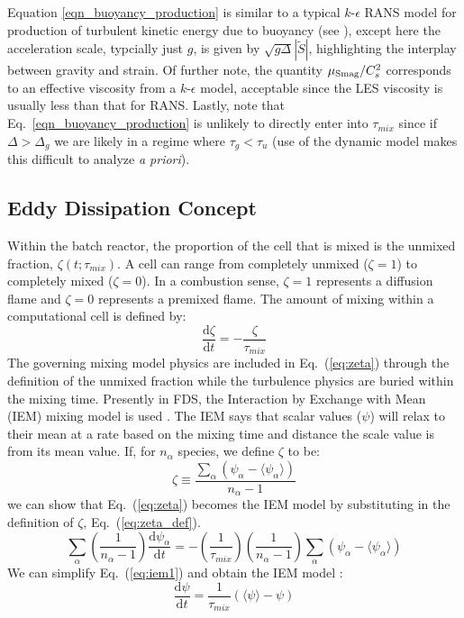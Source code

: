 Equation \ref{eqn_buoyancy_production} is similar to a typical $k$-$\epsilon$ RANS model for production of turbulent kinetic energy due to buoyancy (see \cite{Teiszen:2004b,Merci:2005}), except here the acceleration scale, typcially just $g$, is given by $\sqrt{\!g\Delta}|\tilde{S}|$, highlighting the interplay between gravity and strain.  Of further note, the quantity $\mu_{\mbox{\scriptsize Smag}}/C_s^2$ corresponds to an effective viscosity from a $k$-$\epsilon$ model, acceptable since the LES viscosity is usually less than that for RANS.  Lastly, note that Eq.~\ref{eqn_buoyancy_production} is unlikely to directly enter into $\tau_{mix}$ since if $\Delta > \Delta_g$ we are likely in a regime where $\tau_g < \tau_u$ (use of the dynamic model makes this difficult to analyze \emph{a priori}).


\subsection{Eddy Dissipation Concept}
\label{sec:EDC} 
Within the batch reactor, the proportion of the cell that is mixed is the unmixed fraction, $\zeta(t;\tau_{mix})$. A cell can range from completely unmixed ($\zeta=1$) to completely mixed ($\zeta=0$). In a combustion sense, $\zeta=1$  represents a diffusion flame and $\zeta=0$ represents a premixed flame. The amount of mixing within a computational cell is defined by:
\begin{equation}\label{eq:zeta}
\frac{\mbox{d}\zeta}{\mbox{d}t}=-\frac{\zeta}{\tau_{mix}}
\end{equation}
The governing mixing model physics are included in Eq.~(\ref{eq:zeta}) through the definition of the unmixed fraction while the turbulence physics are buried within the mixing time. Presently in FDS, the Interaction by Exchange with Mean (IEM) mixing model is used \cite{fox2003}. The IEM says that scalar values ($\psi$) will relax to their mean at a rate based on the mixing time and distance the scale value is from its mean value.  If, for $n_{\alpha}$ species, we define $\zeta$ to be:
\begin{equation}\label{eq:zeta_def}
\zeta \equiv \frac{\displaystyle \sum_{\alpha}(\psi_{\alpha}- \langle \psi_{\alpha} \rangle )}{n_{\alpha} - 1}
\end{equation}
we can show that Eq.~(\ref{eq:zeta}) becomes the IEM model by substituting in the definition of $\zeta$, Eq.~(\ref{eq:zeta_def}).
\begin{equation}\label{eq:iem1}
\displaystyle \sum_{\alpha}\left(\frac{1}{n_{\alpha}-1}\right) \frac{\mbox{d}\psi_{\alpha}}{\mbox{d}t} = - \left(\frac{1}{\tau_{mix}}\right) \left(\frac{1}{n_{\alpha}-1} \right) \displaystyle \sum_{\alpha}(\psi_{\alpha}- \langle \psi_{\alpha} \rangle)
\end{equation}
We can simplify Eq.~(\ref{eq:iem1}) and obtain the IEM model \cite{fox2003}:
\begin{equation}\label{eq:iem2}
\frac{\mbox{d}\psi}{\mbox{d}t} = \frac{1}{\tau_{mix}}(\langle \psi \rangle - \psi)
\end{equation}
      
